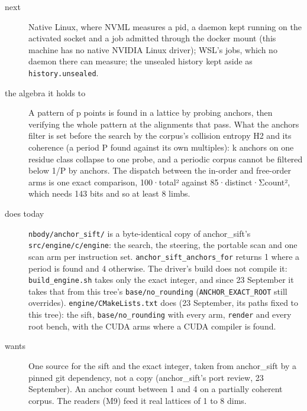 \begin{description}
\item[{next}] Native Linux, where NVML measures a pid, a daemon kept running on the activated socket and a job admitted through the docker mount (this machine has no native NVIDIA Linux driver); WSL's jobs, which no daemon there can measure; the unsealed history kept aside as \texttt{history.\allowbreak{}unsealed}.
\end{description}

\begin{description}
\item[{the algebra it holds to}] A pattern of p points is found in a lattice by probing anchors, then verifying the whole pattern at the alignments that pass. What the anchors filter is set before the search by the corpus's collision entropy H2 and its coherence (a period P found against its own multiples): k anchors on one residue class collapse to one probe, and a periodic corpus cannot be filtered below 1/P by anchors. The dispatch between the in-order and free-order arms is one exact comparison, 100·total² against 85·distinct·Σcount², which needs 143 bits and so at least 8 limbs.
\item[{does today}] \texttt{nbody/\allowbreak{}anchor\_\allowbreak{}sift/\allowbreak{}} is a byte-identical copy of anchor\_\allowbreak{}sift's \texttt{src/\allowbreak{}engine/\allowbreak{}c/\allowbreak{}engine}: the search, the steering, the portable scan and one scan arm per instruction set. \texttt{anchor\_\allowbreak{}sift\_\allowbreak{}anchors\_\allowbreak{}for} returns 1 where a period is found and 4 otherwise. The driver's build does not compile it: \texttt{build\_\allowbreak{}engine.\allowbreak{}sh} takes only the exact integer, and since 23 September it takes that from this tree's \texttt{base/\allowbreak{}no\_\allowbreak{}rounding} (\texttt{ANCHOR\_\allowbreak{}EXACT\_\allowbreak{}ROOT} still overrides). \texttt{engine/\allowbreak{}CMake\allowbreak{}Lists.\allowbreak{}txt} does (23 September, its paths fixed to this tree): the sift, \texttt{base/\allowbreak{}no\_\allowbreak{}rounding} with every arm, \texttt{render} and every root bench, with the CUDA arms where a CUDA compiler is found.
\item[{wants}] One source for the sift and the exact integer, taken from anchor\_\allowbreak{}sift by a pinned git dependency, not a copy (anchor\_\allowbreak{}sift's port review, 23 September). An anchor count between 1 and 4 on a partially coherent corpus. The readers (M9) feed it real lattices of 1 to 8 dims.

\end{description}
